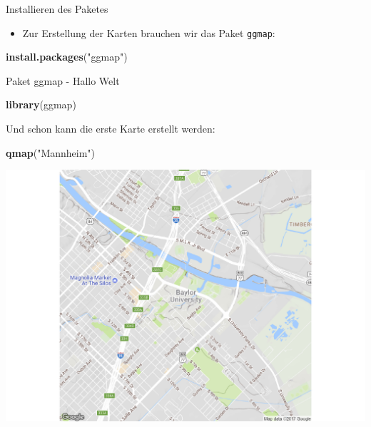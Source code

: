 \documentclass[ignorenonframetext,]{beamer}
\newenvironment{Shaded}{}{}
\newcommand{\KeywordTok}[1]{\textcolor[rgb]{0.00,0.44,0.13}{\textbf{{#1}}}}
\newcommand{\StringTok}[1]{\textcolor[rgb]{0.25,0.44,0.63}{{#1}}}
\newcommand{\NormalTok}[1]{{#1}}
\providecommand{\tightlist}{%
\setlength{\itemsep}{0pt}\setlength{\parskip}{0pt}}
\begin{document}
\begin{frame}[fragile]{Installieren des Paketes}

\begin{itemize}
\tightlist
\item
  Zur Erstellung der Karten brauchen wir das Paket \texttt{ggmap}:
\end{itemize}

\begin{Shaded}
\begin{Highlighting}[]
\KeywordTok{install.packages}\NormalTok{(}\StringTok{"ggmap"}\NormalTok{)}
\end{Highlighting}
\end{Shaded}

\end{frame}

\begin{frame}[fragile]{Paket ggmap - Hallo Welt}

\begin{Shaded}
\begin{Highlighting}[]
\KeywordTok{library}\NormalTok{(ggmap)}
\end{Highlighting}
\end{Shaded}

Und schon kann die erste Karte erstellt werden:

\begin{Shaded}
\begin{Highlighting}[]
\KeywordTok{qmap}\NormalTok{(}\StringTok{"Mannheim"}\NormalTok{)}
\end{Highlighting}
\end{Shaded}

\includegraphics{R_intern_files/figure-beamer/unnamed-chunk-258-1.pdf}

\end{frame}
\end{document}

